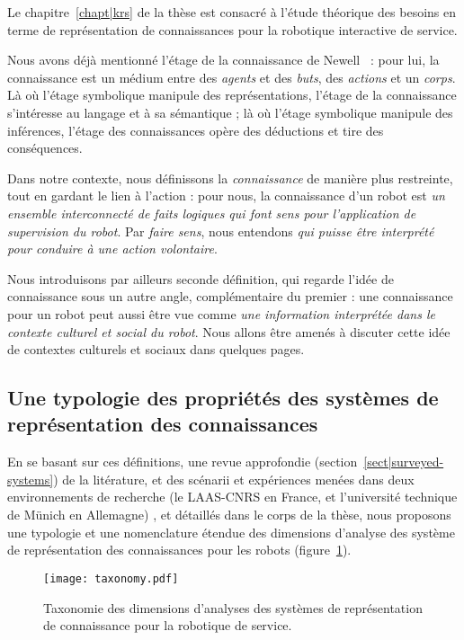 Le chapitre~\ref{chapt|krs} de la thèse est consacré à l'étude théorique des
besoins en terme de représentation de connaissances pour la robotique
interactive de service.

Nous avons déjà mentionné \og l'étage de la connaissance \fg de
Newell~\cite{Newell1981} : pour lui, la connaissance est un médium entre des
\emph{agents} et des \emph{buts}, des \emph{actions} et un \emph{corps}. Là où
l'étage symbolique manipule des représentations, l'étage de la connaissance
s'intéresse au langage et à sa sémantique ; là où l'étage symbolique manipule
des inférences, l'étage des connaissances opère des déductions et tire des
conséquences.

Dans notre contexte, nous définissons la \emph{connaissance} de manière plus
restreinte, tout en gardant le lien à l'action : pour nous, la connaissance
d'un robot est \emph{un ensemble interconnecté de faits logiques qui font sens
pour l'application de supervision du robot}. Par \emph{faire sens}, nous
entendons \emph{qui puisse être interprété pour conduire à une action
volontaire}.

Nous introduisons par ailleurs seconde définition, qui regarde l'idée de
connaissance sous un autre angle, complémentaire du premier : une connaissance
pour un robot peut aussi être vue comme \emph{une information interprétée dans
le contexte culturel et social du robot}. Nous allons être amenés à discuter
cette idée de contextes culturels et sociaux dans quelques pages.

\subsection{Une typologie des propriétés des systèmes de représentation des connaissances}

En se basant sur ces définitions, une revue approfondie
(section~\ref{sect|surveyed-systems}) de la litérature, et des scénarii et
expériences menées dans deux environnements de recherche (le LAAS-CNRS en
France, et l'université technique de Münich en Allemagne) , et détaillés dans
le corps de la thèse, nous proposons une typologie et une nomenclature étendue
des dimensions d'analyse des système de représentation des connaissances pour
les robots (figure~\ref{fig|taxo}).

\begin{figure}
        \centering
        \texttt{[image: taxonomy.pdf]}
        \caption{Taxonomie des dimensions d'analyses des systèmes de 
        représentation de connaissance pour la robotique de service.}
        \label{fig|taxo}
\end{figure}

